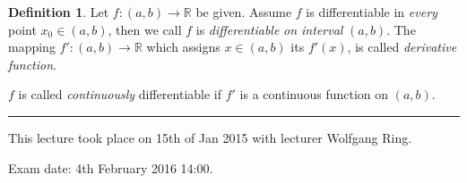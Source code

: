\documentclass[a4paper,landscape,twocolumn]{article}
\theoremstyle{definition}
\newtheorem{defi}{Definition}
\newcommand\meta[3]{\hrule{} This #1 took place on #2 with lecturer #3.\par}
\begin{document}
%
\begin{defi}
  Let $f: (a, b) \to \mathbb R$ be given. Assume $f$ is differentiable
  in \emph{every} point $x_0 \in (a, b)$, then we call $f$ is \emph{differentiable}
  \emph{on interval} $(a, b)$. The mapping $f': (a, b) \to \mathbb R$
  which assigns $x \in (a, b)$ its $f'(x)$, is called \emph{derivative function}.

  $f$ is called \emph{continuously} differentiable if $f'$ is a continuous function
  on $(a, b)$.
\end{defi}

\meta{lecture}{15th of Jan 2015}{Wolfgang Ring}
%
Exam date: 4th February 2016 14:00.

\end{document}
